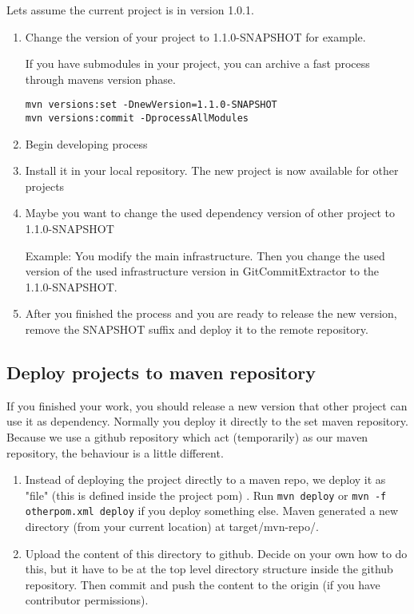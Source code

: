Lets assume the current project is in version 1.0.1. 
\begin{enumerate}
	\item Change the version of your project to 1.1.0-SNAPSHOT for example. 
	
	If you have submodules in your project, you can archive a fast process through mavens version phase. 
	\begin{lstlisting}
mvn versions:set -DnewVersion=1.1.0-SNAPSHOT
mvn versions:commit -DprocessAllModules	
	\end{lstlisting}
	\item Begin developing process
	\item Install it in your local repository. The new project is now available for other projects
	\item Maybe you want to change the used dependency version of other project to 1.1.0-SNAPSHOT
	
	Example: You modify the main \thetool{} infrastructure. Then you change the used version of the used \thetool{} infrastructure version in GitCommitExtractor to the 1.1.0-SNAPSHOT. 
	\item After you finished the process and you are ready to release the new version, remove the SNAPSHOT suffix and deploy it to the remote repository. 
\end{enumerate}

\subsection[Deploy projects]{Deploy projects to maven repository}
If you finished your work, you should release a new version that other project can use it as dependency. Normally you deploy it directly to the set maven repository. Because we use a github repository which act (temporarily) as our maven repository, the behaviour is a little different. 


\begin{enumerate}
	\item Instead of deploying the project directly to a maven repo, we deploy it as "file" (this is defined inside the project pom) .
	Run \lstinline{mvn deploy} or \lstinline{mvn -f otherpom.xml deploy} if you deploy something else. Maven generated a new directory (from your current location) at target/mvn-repo/. 
	\item Upload the content of this directory to github. Decide on your own how to do this, but it have to be at the top level directory structure inside the github repository. Then commit and push the content to the origin (if you have contributor permissions). 
\end{enumerate}
